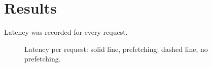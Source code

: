 \section{Results}
Latency was recorded for every request.
\begin{figure}
\caption{Latency per request: solid line, prefetching; dashed line, no prefetching.}
\end{figure}
